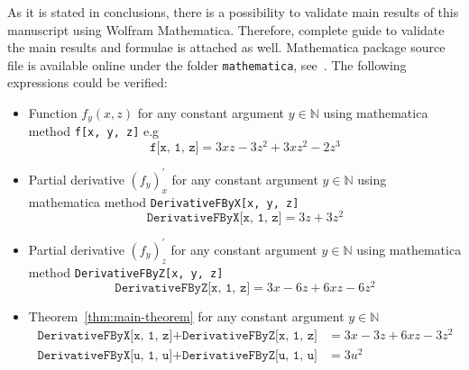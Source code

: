 As it is stated in conclusions, there is a possibility to validate main results of this manuscript using
Wolfram Mathematica.
Therefore, complete guide to validate the main results and formulae is attached as well.
Mathematica package source file is available online under the folder \texttt{mathematica}, see~\cite{GithubSource_2022}.
The following expressions could be verified:
\begin{itemize}
    \item Function $f_y(x,z)$ for any constant argument $y\in\mathbb{N}$ using mathematica method \texttt{f[x, y, z]} e.g
    \[
        \texttt{f[x, 1, z]} = 3 x z - 3 z^2 + 3 x z^2 - 2 z^3
    \]
    \item Partial derivative $(f_y)^{'}_x$ for any constant argument $y\in\mathbb{N}$ using mathematica
    method \texttt{DerivativeFByX[x, y, z]}
    \[
        \texttt{DerivativeFByX[x, 1, z]} = 3 z + 3 z^2
    \]
    \item Partial derivative $(f_y)^{'}_z$ for any constant argument $y\in\mathbb{N}$ using mathematica
    method \texttt{DerivativeFByZ[x, y, z]}
    \[
        \texttt{DerivativeFByZ[x, 1, z]} = 3 x - 6 z + 6 x z - 6 z^2
    \]
    \item Theorem~\ref{thm:main-theorem} for any constant argument $y\in\mathbb{N}$
    \begin{align*}
        \texttt{DerivativeFByX[x, 1, z]} + \texttt{DerivativeFByZ[x, 1, z]} &= 3 x - 3 z + 6 x z - 3 z^2 \\
        \texttt{DerivativeFByX[u, 1, u]} + \texttt{DerivativeFByZ[u, 1, u]} &= 3 u^2
    \end{align*}
\end{itemize}